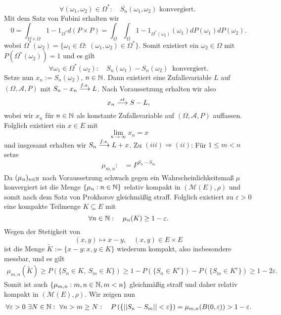 \begin{proof*}
    $$  
        \forall (\omega_1, \omega_2) \in \Omega^*: \quad \overline{S_n}(\omega_1, \omega_2) \text{ konvergiert. }
    $$
    Mit dem Satz von Fubini erhalten wir
    $$
        0 = \int_{\Omega \times \Omega}1 - 1_{\Omega^*} d(P \times P) = \int_{\Omega}\int_{\Omega}1 - 1_{\Omega^*(\omega_2)}(\omega_1)dP(\omega_1)dP(\omega_2). 
    $$
    wobei $\Omega^*(\omega_2) =\{\omega_1\in\Omega: \ (\omega_1, \omega_2) \in \Omega^* \}$. Somit existiert ein $\omega_2 \in \Omega$ mit $P(\Omega^*(\omega_2)) = 1$ und es gilt
    $$
        \forall \omega_1 \in \Omega^*(\omega_2): \quad S_n(\omega_1) - S_n(\omega_2) \ \text{ konvergiert.}
    $$
    Setze nun $x_n := S_n(\omega_2)$, $n \in \mathbb{N}$. Dann existiert eine Zufallsvariable $L$ auf $(\Omega, \mathcal{A}, P)$ mit $S_n - x_n \overset{f.s.}{\longrightarrow} L$. Nach Voraussetzung erhalten wir also 
    $$
        x_n \overset{st}{\longrightarrow} S - L,
    $$
    wobei wir $x_n$ für $n \in \mathbb{N}$ als konstante Zufallsvariable auf $(\Omega, \mathcal{A}, P)$ auffassen. Folglich existiert ein $x \in E$ mit 
    $$
        \lim_{n \to \infty}x_n = x
    $$
    und insgesamt erhalten wir $S_n \overset{f.s.}{\longrightarrow} L + x$. 
    \newline 
    Zu $(iii) \Rightarrow (ii)$: Für $1 \leq m < n$ setze
    \begin{align*}
        \mu_{m,n} :&= P^{S_n - S_m}
    \end{align*}
    Da $(\mu_n)_{n \in \mathbb{N}}$ nach Voraussetzung schwach gegen ein Wahrscheinlichkeitsmaß $\mu$ konvergiert
    ist die Menge $\{\mu_n: n \in \mathbb{N} \}$ relativ kompakt in $(\mathcal{M}(E), \rho)$ und somit nach dem Satz von Prokhorov gleichmäßig straff.
    Folglich existiert zu $\varepsilon > 0$ eine kompakte Teilmenge $K \subseteq E$ mit 
    $$
        \forall n \in \mathbb{N}: \quad \mu_n(K) \geq 1 - \varepsilon. 
    $$
    Wegen der Stetigkeit von 
    $$
        (x,y) \mapsto x - y, \quad (x,y) \in E \times E
    $$
    ist die Menge $\tilde{K} := \{x - y : x,y \in K \}$ wiederum kompakt, also insbesondere messbar, und es gilt
    \begin{align*}
        \mu_{m,n}(\tilde{K}) \geq P(\{S_n \in K, \ S_m \in K\}) \geq 1 - P(\{S_n \in K^c\}) - P(\{S_m \in K^c\}) \geq 1 - 2\varepsilon.
    \end{align*}
    Somit ist auch $\{\mu_{m,n}: m,n \in \mathbb{N}, m < n \}$ gleichmäßig straff und daher relativ kompakt in $(\mathcal{M}(E), \rho)$. 
    Wir zeigen nun
    \begin{align}
        \forall \varepsilon > 0 \ \exists N \in \N: \ \forall n > m \geq N: \quad \prob{\norm{S_n - S_m} < \varepsilon} = \mu_{m,n}(B(0,\varepsilon)) > 1 - \varepsilon.

\end{align}
\end{proof*}
